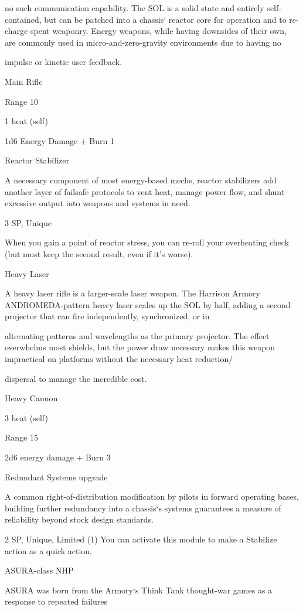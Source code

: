 no such communication capability. The SOL is a solid state and entirely self-contained, but can be patched
into a chassis‘ reactor core for operation and to re-charge spent weaponry. Energy weapons, while having
downsides of their own, are commonly used in micro-and-zero-gravity environments due to having no

impulse or kinetic user feedback.

Main Rifle

Range 10

1 heat (self)

1d6 Energy Damage + Burn 1


Reactor Stabilizer

A necessary component of most energy-based mechs, reactor stabilizers add another layer of failsafe
protocols to vent heat, manage power flow, and shunt excessive output into weapons and systems in need.

3 SP, Unique




When you gain a point of reactor stress, you can re-roll your overheating check (but must keep
the second result, even if it’s worse).


Heavy Laser

A heavy laser rifle is a larger-scale laser weapon. The Harrison Armory ANDROMEDA-pattern heavy laser
scales up the SOL by half, adding a second projector that can fire independently, synchronized, or in

alternating patterns and wavelengths as the primary projector. The effect overwhelms most shields, but the
power draw necessary makes this weapon impractical on platforms without the necessary heat reduction/

dispersal to manage the incredible cost.

Heavy Cannon

3 heat (self)

Range 15

2d6 energy damage + Burn 3


Redundant Systems upgrade

A common right-of-distribution modification by pilots in forward operating bases, building further
redundancy into a chassis‘s systems guarantees a measure of reliability beyond stock design standards.

2 SP, Unique, Limited (1)
You can activate this module to make a Stabilize action as a quick action.


ASURA-class NHP

ASURA was born from the Armory‘s Think Tank thought-war games as a response to repeated failures

